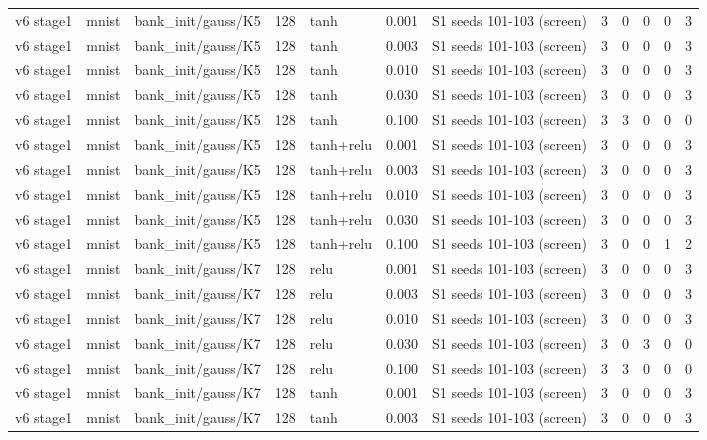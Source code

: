 \begin{table}[htbp]
{\begin{tabular}{@{}lllrlrlrrrrr@{}}
v6 stage1 & mnist & bank\_init/gauss/K5 & 128 & tanh & 0.001 & S1 seeds 101-103 (screen) & 3 & 0 & 0 & 0 & 3 \\
v6 stage1 & mnist & bank\_init/gauss/K5 & 128 & tanh & 0.003 & S1 seeds 101-103 (screen) & 3 & 0 & 0 & 0 & 3 \\
v6 stage1 & mnist & bank\_init/gauss/K5 & 128 & tanh & 0.010 & S1 seeds 101-103 (screen) & 3 & 0 & 0 & 0 & 3 \\
v6 stage1 & mnist & bank\_init/gauss/K5 & 128 & tanh & 0.030 & S1 seeds 101-103 (screen) & 3 & 0 & 0 & 0 & 3 \\
v6 stage1 & mnist & bank\_init/gauss/K5 & 128 & tanh & 0.100 & S1 seeds 101-103 (screen) & 3 & 3 & 0 & 0 & 0 \\
v6 stage1 & mnist & bank\_init/gauss/K5 & 128 & tanh+relu & 0.001 & S1 seeds 101-103 (screen) & 3 & 0 & 0 & 0 & 3 \\
v6 stage1 & mnist & bank\_init/gauss/K5 & 128 & tanh+relu & 0.003 & S1 seeds 101-103 (screen) & 3 & 0 & 0 & 0 & 3 \\
v6 stage1 & mnist & bank\_init/gauss/K5 & 128 & tanh+relu & 0.010 & S1 seeds 101-103 (screen) & 3 & 0 & 0 & 0 & 3 \\
v6 stage1 & mnist & bank\_init/gauss/K5 & 128 & tanh+relu & 0.030 & S1 seeds 101-103 (screen) & 3 & 0 & 0 & 0 & 3 \\
v6 stage1 & mnist & bank\_init/gauss/K5 & 128 & tanh+relu & 0.100 & S1 seeds 101-103 (screen) & 3 & 0 & 0 & 1 & 2 \\
v6 stage1 & mnist & bank\_init/gauss/K7 & 128 & relu & 0.001 & S1 seeds 101-103 (screen) & 3 & 0 & 0 & 0 & 3 \\
v6 stage1 & mnist & bank\_init/gauss/K7 & 128 & relu & 0.003 & S1 seeds 101-103 (screen) & 3 & 0 & 0 & 0 & 3 \\
v6 stage1 & mnist & bank\_init/gauss/K7 & 128 & relu & 0.010 & S1 seeds 101-103 (screen) & 3 & 0 & 0 & 0 & 3 \\
v6 stage1 & mnist & bank\_init/gauss/K7 & 128 & relu & 0.030 & S1 seeds 101-103 (screen) & 3 & 0 & 3 & 0 & 0 \\
v6 stage1 & mnist & bank\_init/gauss/K7 & 128 & relu & 0.100 & S1 seeds 101-103 (screen) & 3 & 3 & 0 & 0 & 0 \\
v6 stage1 & mnist & bank\_init/gauss/K7 & 128 & tanh & 0.001 & S1 seeds 101-103 (screen) & 3 & 0 & 0 & 0 & 3 \\
v6 stage1 & mnist & bank\_init/gauss/K7 & 128 & tanh & 0.003 & S1 seeds 101-103 (screen) & 3 & 0 & 0 & 0 & 3 \\

\end{tabular}}
\end{table}
